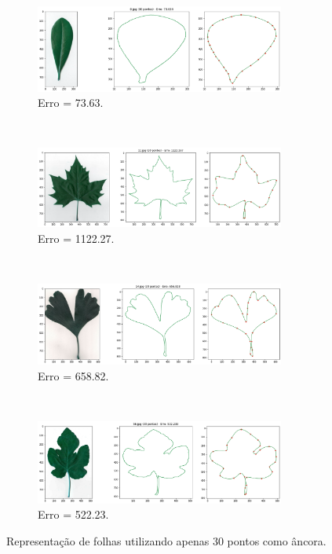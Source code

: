 \begin{figure}[H]
	\centering
	\begin{subfigure}[b]{\textwidth}
		\centering
		\includegraphics[width=0.9\textwidth]{img/res/0_30.png}
		\caption{Erro = 73.63.}
	\end{subfigure}
	\\
	\begin{subfigure}[b]{\textwidth}
		\centering
		\includegraphics[width=0.9\textwidth]{img/res/1_30.png}
		\caption{Erro = 1122.27.}
	\end{subfigure}
	\\
	\begin{subfigure}[b]{\textwidth}
		\centering
		\includegraphics[width=0.9\textwidth]{img/res/2_30.png}
		\caption{Erro = 658.82.}
	\end{subfigure}
	\\
	\begin{subfigure}[b]{\textwidth}
		\centering
		\includegraphics[width=0.9\textwidth]{img/res/3_30.png}
		\caption{Erro = 522.23.}
	\end{subfigure}
	\caption{Representação de folhas utilizando apenas 30 pontos como âncora.}
	\label{fig:folha1rep}
\end{figure}


